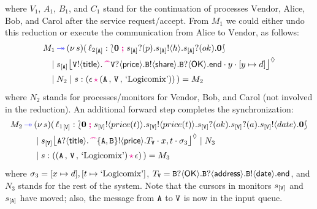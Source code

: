 \documentclass[runningheads,plain]{llncs}
\begin{document}
where 
$V_1$, $A_1$, $B_1$, and $C_1$ 
stand for the continuation of processes $\text{Vendor}$, $\text{Alice}$, $\text{Bob}$, and $\text{Carol}$ after the service 
request/accept. 
From $M_1$ we could either undo this reduction %
or execute the communication from $\text{Alice}$ to $\text{Vendor}$, as 
follows:
\begin{align*}
M_1 & \fw  \news{s}(\,  \np{\key{{\loc_2}}{\pA}}{ \conf{\inact}{\binp{\epA}{p}\bout{\epA}{h}\binp{\epA}{ok}\inact}} 
\\
& \!\!\!\!\Par 
\hmoni{\ep{s}{\pA}}{\ltout{\pS}{\mathsf{title}}{\past \ltinp{\pS}{\mathsf{price}}{\ltout{B}{\mathsf{share}}{\ltinp{B}{\mathsf{OK}}{\lend}}}}}{y}{\upd{y}{d}} 
\\
& \!\!\!\!\Par N_2 \Par \codah{s}{\emp}{\valueq{\pA}{\pS}{\exBook}}{}~)  = M_2
\end{align*}
where $N_2$ stands for  processes/monitors for Vendor, Bob, and Carol (not involved in the reduction). An additional forward step completes the synchronization:
\begin{align*}
M_2 \textcolor{blue}{\,\twoheadrightarrow\,} & (\nu\, s)(\,  {{\ell_1}}_{[\mathtt{V}]}: \lbag \mathbf{0} \; \textcolor{magenta}{\textbf{;}}\; s_{[\mathtt{V}]} ! \langle price(t) \rangle . s_{[\mathtt{V}]} ! \langle price(t) \rangle .s_{[\mathtt{V}]} ? (ok) .  s_{[\mathtt{V}]} ? (a) . s_{[\mathtt{V}]} ! \langle date \rangle .\mathbf{0}  \rbag 
\\
& \;|\; 
{s_{[\mathtt{V}]}\mbox{{\large $\lfloor$}} \textcolor{black}{\mathtt{A}?\langle\mathsf{title}\rangle.\,\textcolor{magenta}{\text{\textbf{\textasciicircum\!\!\textasciicircum}}} \mathtt{\{A,B\}}!\langle\mathsf{price}\rangle.T_\mathtt{V}}\cdot x,t\cdot \sigma_3 \mbox{{\large $\rfloor$}}^{\lozenge}}  \;|\; N_3
\\
&  \;|\; s:((\mathtt{A} \,,\, \mathtt{V} \,,\,\text{`Logicomix'})\,\textcolor{magenta}{\mathbf{\star}}\,\epsilon)\!~)  = M_3
\end{align*}
where 
$\sigma_3  = [x\mapsto d],[t\mapsto \text{`Logicomix'}]$,
$T_\mathsf{\mathtt{V}}  = \mathtt{B}?\langle\mathsf{OK}\rangle.\mathtt{B}?\langle\mathsf{address}\rangle.\mathtt{B}!\langle\mathsf{date}\rangle.\mathsf{end}$,
and $N_3$ stands for the %
rest of the system.
Note that the cursors in monitors $s_{[\mathtt{V}]}$ and $s_{[\mathtt{A}]}$ have moved; also, the message from $\mathtt{A}$ to $\mathtt{V}$ is now in the input queue.
\end{document}
